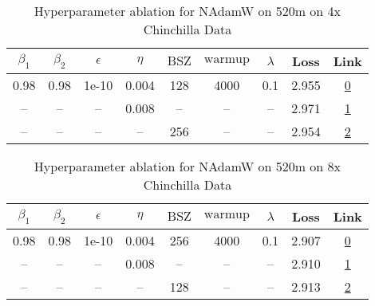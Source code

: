 \begin{table}[H]
\centering
\caption{Hyperparameter ablation for NAdamW on 520m on 4x Chinchilla Data}
\label{tab:ablation_nadamw_520m_4}
\begin{tabular}{ccccccccc}
\toprule
$\beta_1$ & $\beta_2$ & $\epsilon$ & $\eta$ & $\mathrm{BSZ}$ & $\mathrm{warmup}$ & $\lambda$ & Loss & Link \\
\midrule
0.98 & 0.98 & 1e-10 & 0.004 & 128 & 4000 & 0.1 & 2.955 & \href{https://wandb.ai/stanford-mercury/optimizer-scaling/runs/sweep-520m-42B-nadamwcf9d95lr0.004-wd0.1-minlr0-warmup4000-b10.9-40428f}{0} \\
\midrule
-- & -- & -- & 0.008 & -- & -- & -- & 2.971 & \href{https://wandb.ai/stanford-mercury/optimizer-scaling/runs/sweep-520m-42B-nadamwbd85falr0.008-wd0.1-minlr0-warmup4000-b10.9-2ceead}{1} \\
-- & -- & -- & -- & 256 & -- & -- & 2.954 & \href{https://wandb.ai/stanford-mercury/optimizer-scaling/runs/sweep-520m-42B-nadamw0a1fe6lr0.004-wd0.1-minlr0-warmup4000-b10.9-2395f8}{2} \\
\bottomrule
\end{tabular}
\end{table}

\begin{table}[H]
\centering
\caption{Hyperparameter ablation for NAdamW on 520m on 8x Chinchilla Data}
\label{tab:ablation_nadamw_520m_8}
\begin{tabular}{ccccccccc}
\toprule
$\beta_1$ & $\beta_2$ & $\epsilon$ & $\eta$ & $\mathrm{BSZ}$ & $\mathrm{warmup}$ & $\lambda$ & Loss & Link \\
\midrule
0.98 & 0.98 & 1e-10 & 0.004 & 256 & 4000 & 0.1 & 2.907 & \href{https://wandb.ai/stanford-mercury/optimizer-scaling/runs/sweep-520m-85B-nadamwcf9d95lr0.004-wd0.1-minlr0-warmup4000-b10.9-d09912}{0} \\
\midrule
-- & -- & -- & 0.008 & -- & -- & -- & 2.910 & \href{https://wandb.ai/stanford-mercury/optimizer-scaling/runs/sweep-520m-85B-nadamwpbd85falr0.008-wd0.1-minlr0-warmup4000-b10.-9c80f6}{1} \\
-- & -- & -- & -- & 128 & -- & -- & 2.913 & \href{https://wandb.ai/stanford-mercury/optimizer-scaling/runs/sweep-520m-85B-nadamwpe2b0f0lr0.004-wd0.1-minlr0-warmup4000-b10.-262c7c}{2} \\
\bottomrule
\end{tabular}
\end{table}

